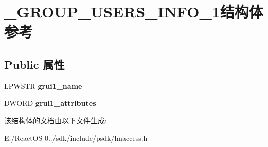 \hypertarget{struct___g_r_o_u_p___u_s_e_r_s___i_n_f_o__1}{}\section{\+\_\+\+G\+R\+O\+U\+P\+\_\+\+U\+S\+E\+R\+S\+\_\+\+I\+N\+F\+O\+\_\+1结构体 参考}
\label{struct___g_r_o_u_p___u_s_e_r_s___i_n_f_o__1}
\subsection*{Public 属性}
\begin{DoxyCompactItemize}
\item 
\mbox{\label{struct___g_r_o_u_p___u_s_e_r_s___i_n_f_o__1_aa284cc14163cfa0a9f4f7b7fd9e0d125}} 
L\+P\+W\+S\+TR {\bfseries grui1\+\_\+name}
\item 
\mbox{\label{struct___g_r_o_u_p___u_s_e_r_s___i_n_f_o__1_a010c4de9aecf11f71f15a100efa7ddb7}} 
D\+W\+O\+RD {\bfseries grui1\+\_\+attributes}
\end{DoxyCompactItemize}


该结构体的文档由以下文件生成\+:\begin{DoxyCompactItemize}
\item 
E\+:/\+React\+O\+S-\/0../sdk/include/psdk/lmaccess.\+h\end{DoxyCompactItemize}
